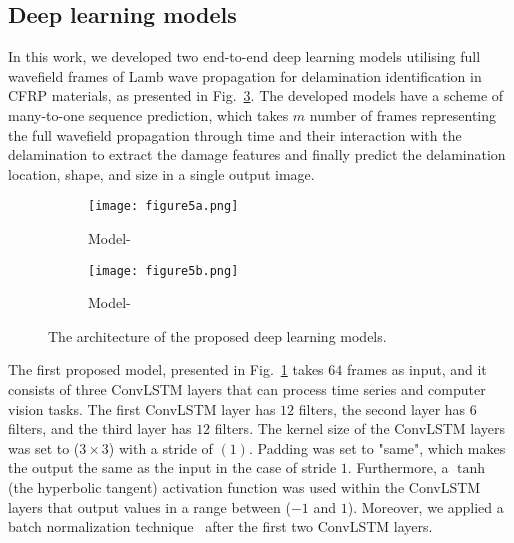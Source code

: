 \subsection{Deep learning models}
\label{proposed_approach}
In this work, we developed two end-to-end deep learning models utilising full wavefield frames of Lamb wave propagation for delamination identification in CFRP materials, as presented in Fig.~\ref{fig:proposed_models}.
The developed models have a scheme of many-to-one sequence prediction, which takes \(m\) number of frames representing the full wavefield propagation through time and their interaction with the delamination to extract the damage features and finally predict the delamination location, shape, and size in a single output image.
\begin{figure} [!h]
	\centering
	\begin{subfigure}[b]{0.49\textwidth}
		\centering
		\texttt{[image: figure5a.png]}
		\caption{Model-} %
		\label{fig:convlstm_model}
	\end{subfigure}
	\hfill
	\begin{subfigure}[b]{0.49\textwidth}
		\centering
		\texttt{[image: figure5b.png]}
		\caption{Model-} %
		\label{fig:AE_convlstm}
	\end{subfigure}
	\caption{The architecture of the proposed deep learning models.}
	\label{fig:proposed_models}
\end{figure} 

The first proposed model, presented in Fig.~\ref{fig:convlstm_model} takes \(64\) frames as input, and it consists of three ConvLSTM layers that can process time series and computer vision tasks.
The first ConvLSTM layer has \(12\) filters, the second layer has \(6\) filters, and the third layer has \(12\) filters.
The kernel size of the ConvLSTM layers was set to (\(3\times3\)) with a stride of \((1)\). 
Padding was set to "same", which makes the output the same as the input in the case of stride \(1\).
Furthermore, a \(\tanh\) (the hyperbolic tangent) activation function was used within the ConvLSTM layers that output values in a range between (\(-1\) and \(1\)).
Moreover, we applied a batch normalization technique~\cite{Santurkar2018} after the first two ConvLSTM layers.

